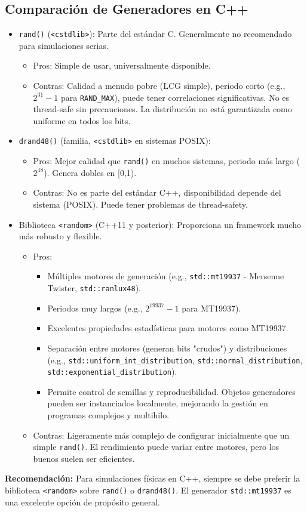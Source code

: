 \documentclass[11pt,a4paper]{article}
\begin{document}
\subsection{Comparación de Generadores en C++}
\begin{itemize}
    \item \texttt{rand()} (\texttt{<cstdlib>}): Parte del estándar C. Generalmente no recomendado para simulaciones serias.
        \begin{itemize}
            \item Pros: Simple de usar, universalmente disponible.
            \item Contras: Calidad a menudo pobre (LCG simple), periodo corto (e.g., $2^{31}-1$ para \texttt{RAND\_MAX}), puede tener correlaciones significativas. No es thread-safe sin precauciones. La distribución no está garantizada como uniforme en todos los bits.
        \end{itemize}
    \item \texttt{drand48()} (familia, \texttt{<cstdlib>} en sistemas POSIX):
        \begin{itemize}
            \item Pros: Mejor calidad que \texttt{rand()} en muchos sistemas, periodo más largo ($2^{48}$). Genera dobles en [0,1).
            \item Contras: No es parte del estándar C++, disponibilidad depende del sistema (POSIX). Puede tener problemas de thread-safety.
        \end{itemize}
    \item Biblioteca \texttt{<random>} (C++11 y posterior): Proporciona un framework mucho más robusto y flexible.
        \begin{itemize}
            \item Pros:
                \begin{itemize}
                    \item Múltiples motores de generación (e.g., \texttt{std::mt19937} - Mersenne Twister, \texttt{std::ranlux48}).
                    \item Periodos muy largos (e.g., $2^{19937}-1$ para MT19937).
                    \item Excelentes propiedades estadísticas para motores como MT19937.
                    \item Separación entre motores (generan bits "crudos") y distribuciones (e.g., \texttt{std::uniform\_int\_distribution}, \texttt{std::normal\_distribution}, \texttt{std::exponential\_distribution}).
                    \item Permite control de semillas y reproducibilidad. Objetos generadores pueden ser instanciados localmente, mejorando la gestión en programas complejos y multihilo.
                \end{itemize}
            \item Contras: Ligeramente más complejo de configurar inicialmente que un simple \texttt{rand()}. El rendimiento puede variar entre motores, pero los buenos suelen ser eficientes.
        \end{itemize}
\end{itemize}
\textbf{Recomendación:} Para simulaciones físicas en C++, siempre se debe preferir la biblioteca \texttt{<random>} sobre \texttt{rand()} o \texttt{drand48()}. El generador \texttt{std::mt19937} es una excelente opción de propósito general.
\end{document}
